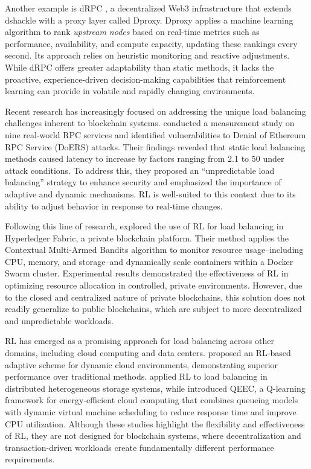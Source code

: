 \documentclass[lnbip]{svmultln}
\begin{document}
Another example is dRPC \cite{ajala2024}, a decentralized Web3 infrastructure that extends dshackle with a proxy layer called Dproxy. Dproxy applies a machine learning algorithm to rank \textit{upstream nodes} based on real-time metrics such as performance, availability, and compute capacity, updating these rankings every second. Its approach relies on heuristic monitoring and reactive adjustments. While dRPC offers greater adaptability than static methods, it lacks the proactive, experience-driven decision-making capabilities that reinforcement learning can provide in volatile and rapidly changing environments.

Recent research has increasingly focused on addressing the unique load balancing challenges inherent to blockchain systems. \citeauthor{li2021} \cite{li2021} conducted a measurement study on nine real-world RPC services and identified vulnerabilities to Denial of Ethereum RPC Service (DoERS) attacks. Their findings revealed that static load balancing methods caused latency to increase by factors ranging from 2.1 to 50 under attack conditions. To address this, they proposed an “unpredictable load balancing” strategy to enhance security and emphasized the importance of adaptive and dynamic mechanisms. RL is well-suited to this context due to its ability to adjust behavior in response to real-time changes.

Following this line of research, \citeauthor{alotaibi2022} \cite{alotaibi2022} explored the use of RL for load balancing in Hyperledger Fabric, a private blockchain platform. Their method applies the Contextual Multi-Armed Bandits algorithm to monitor resource usage--including CPU, memory, and storage--and dynamically scale containers within a Docker Swarm cluster. Experimental results demonstrated the effectiveness of RL in optimizing resource allocation in controlled, private environments. However, due to the closed and centralized nature of private blockchains, this solution does not readily generalize to public blockchains, which are subject to more decentralized and unpredictable workloads.

RL has emerged as a promising approach for load balancing across other domains, including cloud computing and data centers.  \citeauthor{chawla2024} \cite{chawla2024} proposed an RL-based adaptive scheme for dynamic cloud environments, demonstrating superior performance over traditional methods. \citeauthor{park2022} \cite{park2022} applied RL to load balancing in distributed heterogeneous storage systems, while \citeauthor{ding2020} \cite{ding2020} introduced QEEC, a Q-learning framework for energy-efficient cloud computing that combines queueing models with dynamic virtual machine scheduling to reduce response time and improve CPU utilization. Although these studies highlight the flexibility and effectiveness of RL, they are not designed for blockchain systems, where decentralization and transaction-driven workloads create fundamentally different performance requirements.
\end{document}

